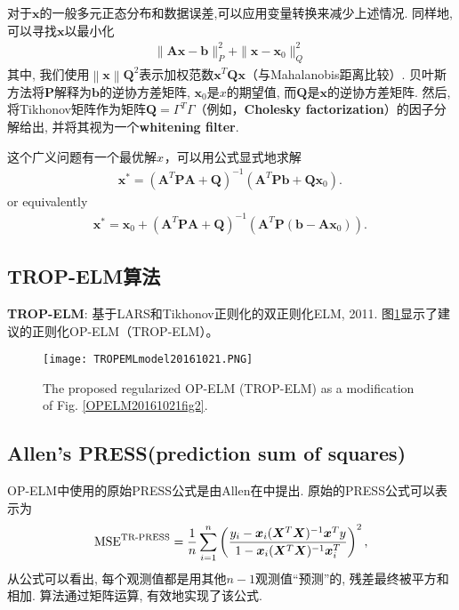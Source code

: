 对于$\bm x$的一般多元正态分布和数据误差,可以应用变量转换来减少上述情况. 同样地, 可以寻找$\bm x$以最小化
\begin{align}
  \|\bm A\bm x-\bm b\|_{P}^{2}+\|\bm x-\bm x_{0}\|_{Q}^{2}\,
\end{align}
其中, 我们使用$\left\|\bm x\right\|{\bm Q}^{2}$表示加权范数$\bm x^{T}\bm Q\bm x$（与Mahalanobis距离比较）.
贝叶斯方法将$\bm P$解释为$\bm b$的逆协方差矩阵, $\bm x_0$是$x$的期望值, 而$\bm Q$是$\bm x$的逆协方差矩阵.
然后, 将Tikhonov矩阵作为矩阵$\displaystyle\bm Q=\Gamma^{T}\Gamma$（例如，\textbf{Cholesky factorization}）的因子分解给出, 并将其视为一个\textbf{whitening filter}.

这个广义问题有一个最优解$x^{}$，可以用公式显式地求解
\begin{align}
  \bm x^{*}=(\bm A^{T}\bm P\bm A+\bm Q)^{-1}(\bm A^{T}\bm P\bm b+\bm Q\bm x_{0}).\,
\end{align}
or equivalently
\begin{align}
  \bm x^{*}=\bm x_{0}+(\bm A^{T}\bm P\bm A+\bm Q)^{-1}(\bm A^{T}\bm P(\bm b-\bm A \bm x_{0})).\,
\end{align}
\subsection{TROP-ELM算法}
\textbf{TROP-ELM}: 基于LARS和Tikhonov正则化的双正则化ELM\cite{MichevanHeeswijk2011-30641}, 2011.
图\ref{TROPEMLmodel20161021fig2}显示了建议的正则化OP-ELM（TROP-ELM）。
\begin{figure}[H]
\begin{center}
\texttt{[image: TROPEMLmodel20161021.PNG]}
\end{center}
\caption{The proposed regularized OP-ELM (TROP-ELM) as a modification of Fig. \ref{OPELM20161021fig2}.}
\label{TROPEMLmodel20161021fig2}
\end{figure}
\subsection{Allen's PRESS(prediction sum of squares)}
OP-ELM中使用的原始PRESS公式是由Allen在\cite{MADavid1972}中提出. 原始的PRESS公式可以表示为
\begin{align}
  \textup{MSE}^{\textup{TR-PRESS}}=\frac 1 n \sum_{i=1}^n \left( \frac{y_i-\bm x_i(\bm X^T \bm X)^{-1}\bm x^T y  }
       {1-\bm x_i(\bm X^T \bm X)^{-1}\bm x_i^T}\right)^2,
\end{align}
从公式可以看出, 每个观测值都是用其他$n-1$观测值“预测”的, 残差最终被平方和相加. 算法通过矩阵运算, 有效地实现了该公式.

